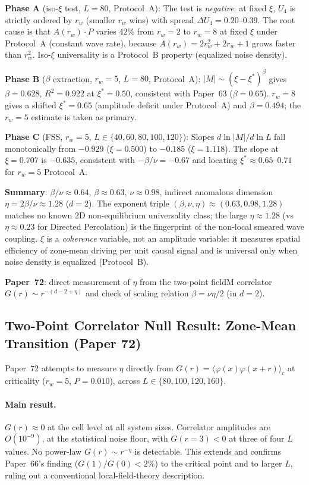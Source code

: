 \documentclass[11pt]{article}
\begin{document}
\textbf{Phase A} (iso-$\xi$ test, $L=80$, Protocol~A):
The test is \emph{negative}: at fixed $\xi$, $U_4$ is strictly ordered by $r_w$
(smaller $r_w$ wins) with spread $\Delta U_4 = 0.20$--$0.39$.
The root cause is that $A(r_w)\cdot P$ varies $42\%$ from $r_w=2$ to $r_w=8$
at fixed $\xi$ under Protocol~A (constant wave rate), because
$A(r_w) = 2r_w^2+2r_w+1$ grows faster than $r_w^2$.
Iso-$\xi$ universality is a Protocol~B property (equalized noise density).

\textbf{Phase B} ($\beta$ extraction, $r_w=5$, $L=80$, Protocol~A):
$|M|\sim(\xi-\xi^*)^\beta$ gives $\beta=0.628$, $R^2=0.922$ at $\xi^*=0.50$,
consistent with Paper~63 ($\beta=0.65$).
$r_w=8$ gives a shifted $\xi^*=0.65$ (amplitude deficit under Protocol~A)
and $\beta=0.494$; the $r_w=5$ estimate is taken as primary.

\textbf{Phase C} (FSS, $r_w=5$, $L\in\{40,60,80,100,120\}$):
Slopes $d\ln|M|/d\ln L$ fall monotonically from $-0.929$ ($\xi=0.500$) to
$-0.185$ ($\xi=1.118$).
The slope at $\xi=0.707$ is $-0.635$, consistent with $-\beta/\nu=-0.67$ and
locating $\xi^*\approx0.65$--$0.71$ for $r_w=5$ Protocol~A.

\textbf{Summary}: $\beta/\nu\approx0.64$, $\beta\approx0.63$, $\nu\approx0.98$,
indirect anomalous dimension $\eta=2\beta/\nu\approx1.28$ ($d=2$).
The exponent triple $(\beta,\nu,\eta)\approx(0.63,0.98,1.28)$ matches no known
2D non-equilibrium universality class; the large $\eta\approx1.28$ (vs
$\eta\approx0.23$ for Directed Percolation) is the fingerprint of the
non-local smeared wave coupling.
$\xi$ is a \emph{coherence} variable, not an amplitude variable:
it measures spatial efficiency of zone-mean driving per unit causal signal
and is universal only when noise density is equalized (Protocol~B).

\textbf{Paper~72}: direct measurement of $\eta$ from the two-point fieldM
correlator $G(r)\sim r^{-(d-2+\eta)}$ and check of scaling relation
$\beta=\nu\eta/2$ (in $d=2$).

\subsection{Two-Point Correlator Null Result: Zone-Mean Transition (Paper 72)}

Paper~72 attempts to measure $\eta$ directly from
$G(r)=\langle\varphi(x)\varphi(x{+}r)\rangle_c$ at criticality
($r_w{=}5$, $P{=}0.010$), across $L\in\{80,100,120,160\}$.

\paragraph{Main result.}
$G(r)\approx0$ at the cell level at all system sizes.
Correlator amplitudes are $O(10^{-9})$, at the statistical noise floor,
with $G(r{=}3)<0$ at three of four $L$ values.
No power-law $G(r)\sim r^{-\eta}$ is detectable.
This extends and confirms Paper~66's finding ($G(1)/G(0)<2\%$) to the critical
point and to larger $L$, ruling out a conventional local-field-theory description.
\end{document}
